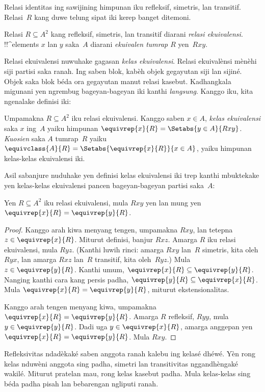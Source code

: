 \documentclass[../../../include/open-logic-section]{subfiles}
\begin{document}


Relasi identitas ing sawijining himpunan iku refleksif, simetris,
lan transitif. Relasi~$R$ kang duwe telung sipat iki kerep
banget ditemoni.

\begin{defn}
Relasi $R \subseteq A^2$ kang refleksif, simetris,
lan transitif diarani \emph{relasi ekuivalensi}.
!!^{element}s $x$ lan $y$ saka~$A$ diarani
\emph{ekuivalen tumrap $R$} yen~$Rxy$.
\end{defn}

Relasi ekuivalensi nuwuhake gagasan \emph{kelas ekuivalensi}.
Relasi ekuivalènsi mènèhi siji partisi saka ranah.
Ing saben blok, kabèh objek gegayutan siji lan sijiné.
Objek saka blok béda ora gegayutan manut relasi kasebut. Kadhangkala migunani yen
ngrembug bageyan-bageyan iki kanthi \emph{langsung}.
Kanggo iku, kita ngenalake definisi iki:

\begin{defn}
Umpamakna $R \subseteq A^2$ iku relasi ekuivalensi.
Kanggo saben $x \in A$, \emph{kelas ekuivalensi} saka $x$
ing~$A$ yaiku himpunan
$\equivrep{x}{R}= \Setabs{y \in A}{Rxy}$.
\emph{Kuosien} saka $A$ tumrap~$R$ yaiku
$\equivclass{A}{R} = \Setabs{\equivrep{x}{R}}{x \in A}$,
yaiku himpunan kelas-kelas ekuivalensi iki.
\end{defn}

Asil sabanjure nuduhake yen definisi kelas ekuivalensi iki trep kanthi
mbuktekake yen kelas-kelas ekuivalensi pancen bageyan-bageyan
partisi saka~$A$:

\begin{prop}
Yen $R \subseteq A^2$ iku relasi ekuivalensi,
mula $Rxy$ yen lan mung yen
$\equivrep{x}{R} = \equivrep{y}{R}$.
\end{prop}

\begin{proof}
Kanggo arah kiwa menyang tengen, umpamakna $Rxy$,
lan tetepna $z \in\equivrep{x}{R}$.
Miturut definisi, banjur $Rxz$.
Amarga $R$ iku relasi ekuivalensi, mula $Ryz$.
(Kanthi luwih rinci: amarga $Rxy$ lan~$R$ simetris,
kita oleh $Ryx$, lan amarga $Rxz$ lan~$R$ transitif,
kita oleh~$Ryz$.) Mula $z \in \equivrep{y}{R}$.
Kanthi umum, $\equivrep{x}{R} \subseteq \equivrep{y}{R}$.
Nanging kanthi cara kang persis padha,
$\equivrep{y}{R} \subseteq \equivrep{x}{R}$.
Mula $\equivrep{x}{R} =\equivrep{y}{R}$,
miturut ekstensionalitas.

Kanggo arah tengen menyang kiwa, umpamakna
$\equivrep{x}{R} =\equivrep{y}{R}$.
Amarga $R$ refleksif, $Ryy$, mula
$y \in\equivrep{y}{R}$. Dadi uga
$y \in \equivrep{x}{R}$, amarga anggepan yen
$\equivrep{x}{R} = \equivrep{y}{R}$.
Mula $Rxy$.
\end{proof}
Refleksivitas ndadèkaké saben anggota ranah kalebu ing kelasé
dhéwé. Yèn rong kelas nduwèni anggota sing padha, simetri lan
transitivitas nggandhèngaké wakilé. Miturut pratelan mau, rong
kelas kasebut padha. Mula kelas-kelas sing béda padha pisah
lan bebarengan ngliputi ranah.
\end{document}
